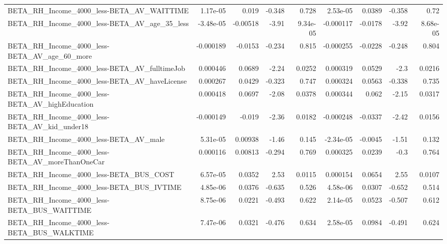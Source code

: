 \begin{tabular}{lrrrrrrrr}
BETA\_RH\_Income\_4000\_less-BETA\_AV\_WAITTIME          &    1.17e-05 &        0.019 &   -0.348 &    0.728 &   2.53e-05 &      0.0389 &       -0.358 &          0.72 \\
BETA\_RH\_Income\_4000\_less-BETA\_AV\_age\_35\_less       &   -3.48e-05 &     -0.00518 &    -3.91 & 9.34e-05 &  -0.000117 &     -0.0178 &        -3.92 &      8.68e-05 \\
BETA\_RH\_Income\_4000\_less-BETA\_AV\_age\_60\_more       &   -0.000189 &      -0.0153 &   -0.234 &    0.815 &  -0.000255 &     -0.0228 &       -0.248 &         0.804 \\
BETA\_RH\_Income\_4000\_less-BETA\_AV\_fulltimeJob       &    0.000446 &       0.0689 &    -2.24 &   0.0252 &   0.000319 &      0.0529 &         -2.3 &        0.0216 \\
BETA\_RH\_Income\_4000\_less-BETA\_AV\_haveLicense       &    0.000267 &       0.0429 &   -0.323 &    0.747 &   0.000324 &      0.0563 &       -0.338 &         0.735 \\
BETA\_RH\_Income\_4000\_less-BETA\_AV\_highEducation     &    0.000418 &       0.0697 &    -2.08 &   0.0378 &   0.000344 &       0.062 &        -2.15 &        0.0317 \\
BETA\_RH\_Income\_4000\_less-BETA\_AV\_kid\_under18       &   -0.000149 &       -0.019 &    -2.36 &   0.0182 &  -0.000248 &     -0.0337 &        -2.42 &        0.0156 \\
BETA\_RH\_Income\_4000\_less-BETA\_AV\_male              &    5.31e-05 &      0.00938 &    -1.46 &    0.145 &  -2.34e-05 &     -0.0045 &        -1.51 &         0.132 \\
BETA\_RH\_Income\_4000\_less-BETA\_AV\_moreThanOneCar    &    0.000116 &      0.00813 &   -0.294 &    0.769 &   0.000325 &      0.0239 &         -0.3 &         0.764 \\
BETA\_RH\_Income\_4000\_less-BETA\_BUS\_COST             &    6.57e-05 &       0.0352 &     2.53 &   0.0115 &   0.000154 &      0.0654 &         2.55 &        0.0107 \\
BETA\_RH\_Income\_4000\_less-BETA\_BUS\_IVTIME           &    4.85e-06 &       0.0376 &   -0.635 &    0.526 &   4.58e-06 &      0.0307 &       -0.652 &         0.514 \\
BETA\_RH\_Income\_4000\_less-BETA\_BUS\_WAITTIME         &    8.75e-06 &       0.0221 &   -0.493 &    0.622 &   2.14e-05 &      0.0523 &       -0.507 &         0.612 \\
BETA\_RH\_Income\_4000\_less-BETA\_BUS\_WALKTIME         &    7.47e-06 &       0.0321 &   -0.476 &    0.634 &   2.58e-05 &      0.0984 &       -0.491 &         0.624 \\

\end{tabular}

